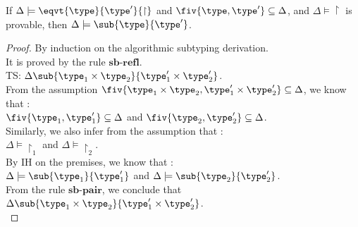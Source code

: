 \begin{thm}
 If $\Delta \models \eqvt{\type}{\type'}{\restriction}$ and $\fiv{\type, \type'} \subseteq \Delta $, and $\Delta \models \restriction $ is provable, then $ \Delta \models \sub{\type}{\type'} $.
\end{thm}
\begin{proof}
By induction on the algorithmic subtyping derivation.\\
It is proved by the rule $\textbf{sb-refl}$.\\

  TS: $\Delta \sub{\type_1 \times \type_2}{\type_1' \times \type_2'} $.\\
 From the assumption $ \fiv{\type_1 \times \type_2, \type_1' \times \type_2'} \subseteq \Delta $, we know that :\\
 $ \fiv{\type_1, \type_1'} \subseteq \Delta $ and $ \fiv{\type_2, \type_2'} \subseteq \Delta $.\\
 Similarly, we also infer from the assumption that : \\
 $\Delta \models \restriction_1  $ and $\Delta \models \restriction_2 $. \\
 By IH on the premises, we know that : \\
 $\Delta \models \sub{\type_1}{\type_1'}$ and $\Delta \models \sub{\type_2}{\type_2'}$.\\
 From the rule $\textbf{sb-pair}$, we conclude that $\Delta \sub{\type_1 \times \type_2}{\type_1' \times \type_2'} $.\\
 
    

\end{proof}
